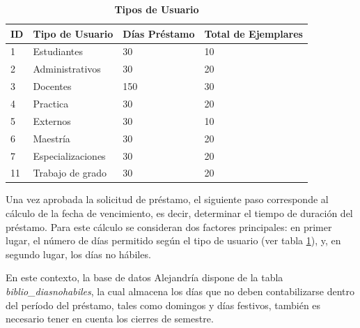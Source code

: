 \documentclass[spanish]{ieee_upb}
\begin{document}
\begin{enumerate}
    \begin{table}[H]
        \centering
        \caption[Nombre en la lista de tablas]{\bfseries Tipos de Usuario}
        \label{tabla:tiposUsuario}
        \begin{tabular}{|l|l|l|l|}
        \hline
        \textbf{ID} & \textbf{Tipo de Usuario} & \textbf{Días Préstamo} & \textbf{Total de Ejemplares} \\ \hline
        1           & Estudiantes              & 30                     & 10                           \\ \hline
        2           & Administrativos          & 30                     & 20                           \\ \hline
        3           & Docentes                 & 150                    & 30                           \\ \hline
        4           & Practica                 & 30                     & 20                           \\ \hline
        5           & Externos                 & 30                     & 10                           \\ \hline
        6           & Maestría                 & 30                     & 20                           \\ \hline
        7           & Especializaciones        & 30                     & 20                           \\ \hline
        11          & Trabajo de grado         & 30                     & 20                           \\ \hline
        \end{tabular}
    \end{table}

\end{enumerate}

Una vez aprobada la solicitud de préstamo, el siguiente paso corresponde al cálculo de la fecha de vencimiento, es decir, determinar el tiempo de duración del préstamo. Para este cálculo se consideran dos factores principales: en primer lugar, el número de días permitido según el tipo de usuario (ver tabla \ref{tabla:tiposUsuario}), y, en segundo lugar, los días no hábiles.
\vspace{0.3 cm}

En este contexto, la base de datos Alejandría dispone de la tabla \textit{biblio\_diasnohabiles}, la cual almacena los días que no deben contabilizarse dentro del período del préstamo, tales como domingos y días festivos, también es necesario tener en cuenta los cierres de semestre.
\vspace{0.3 cm}
\end{document}
